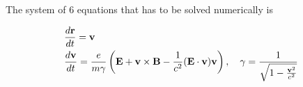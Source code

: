 The system of 6 equations that has to be solved numerically is
\begin{highlightbox}[title={Equations of motion for numerical integration}]
  \begin{align}
    & \frac{d{\bf r}}{dt}={\bf v}\\
    & \frac{d{\bf v}}{dt}=\frac{e}{m\gamma}\left({\bf E}+{\bf v}\times{\bf B}-\frac1{c^2}({\bf E}\cdot{\bf v}){\bf v}\right),\quad \gamma = \frac1{\sqrt{1-\frac{{\bf v}^2}{c^2}}}
  \end{align}
\end{highlightbox}
